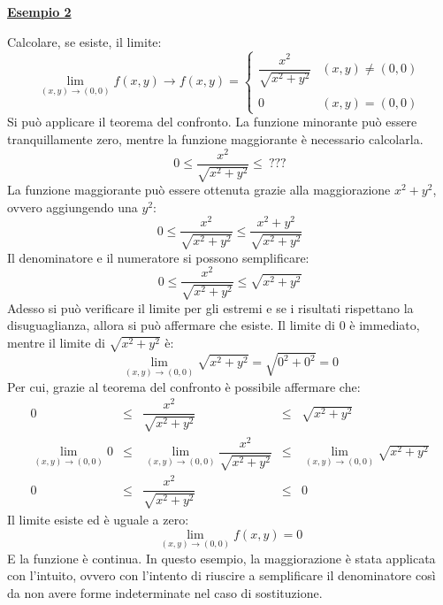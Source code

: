 \documentclass[a4paper]{article}
\newcommand{\example}[1]{\textcolor{Green4}{\textbf{#1}}}
\begin{document}
	\begin{flushleft}
		\example{\underline{Esempio 2}}
	\end{flushleft}
	Calcolare, se esiste, il limite:
	\begin{equation*}
		\displaystyle\lim_{\left(x,y\right) \rightarrow \left(0,0\right)} f\left(x,y\right) \rightarrow f\left(x,y\right) = 
		\begin{cases}
			\dfrac{x^{2}}{\sqrt{x^{2} + y^{2}}}	& \left(x,y\right) \ne \left(0,0\right) \\ \\
			0									& \left(x,y\right) = \left(0,0\right)
		\end{cases}
	\end{equation*}
	Si può applicare il teorema del confronto. La funzione minorante può essere tranquillamente zero, mentre la funzione maggiorante è necessario calcolarla.
	\begin{equation*}
		0 \le \dfrac{x^{2}}{\sqrt{x^{2} + y^{2}}} \le \: ???
	\end{equation*}
	La funzione maggiorante può essere ottenuta grazie alla maggiorazione $x^{2} + y^{2}$, ovvero aggiungendo una $y^{2}$:
	\begin{equation*}
		0 \le \dfrac{x^{2}}{\sqrt{x^{2} + y^{2}}} \le \dfrac{x^{2} + y^{2}}{\sqrt{x^{2} + y^{2}}}
	\end{equation*}
	Il denominatore e il numeratore si possono semplificare:
	\begin{equation*}
		0 \le \dfrac{x^{2}}{\sqrt{x^{2} + y^{2}}} \le \sqrt{x^{2}+y^{2}}
	\end{equation*}
	Adesso si può verificare il limite per gli estremi e se i risultati rispettano la disuguaglianza, allora si può affermare che esiste. Il limite di $0$ è immediato, mentre il limite di $\sqrt{x^{2} + y^{2}}$ è:
	\begin{equation*}
		\displaystyle\lim_{\left(x,y\right) \rightarrow \left(0,0\right)} \sqrt{x^{2} + y^{2}} = \sqrt{0^{2} + 0^{2}} = 0
	\end{equation*}
	Per cui, grazie al teorema del confronto è possibile affermare che:
	\begin{equation*}
		\begin{array}{rcccl}
			0 &\le& \dfrac{x^{2}}{\sqrt{x^{2} + y^{2}}} &\le& \sqrt{x^{2}+y^{2}} \\ [1em]
			\displaystyle\lim_{\left(x,y\right)\rightarrow\left(0,0\right)} 0 &\le& \displaystyle\lim_{\left(x,y\right)\rightarrow\left(0,0\right)}\dfrac{x^{2}}{\sqrt{x^{2} + y^{2}}} &\le& \displaystyle\lim_{\left(x,y\right)\rightarrow\left(0,0\right)} \sqrt{x^{2}+y^{2}} \\ [1em]
			0 &\le& \dfrac{x^{2}}{\sqrt{x^{2} + y^{2}}} &\le& 0
		\end{array}
	\end{equation*}
	Il limite esiste ed è uguale a zero:
	\begin{equation*}
		\displaystyle\lim_{\left(x,y\right) \rightarrow \left(0,0\right)} f\left(x,y\right) = 0
	\end{equation*}
	E la funzione è continua. In questo esempio, la maggiorazione è stata applicata con l'intuito, ovvero con l'intento di riuscire a semplificare il denominatore così da non avere forme indeterminate nel caso di sostituzione.\newpage
\end{document}
